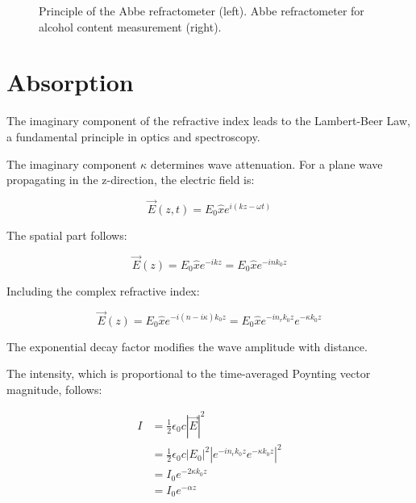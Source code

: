 \documentclass[
  a4paper,
]{book}
\begin{document}
\begin{tcolorbox}
\begin{figure}[H]
\caption{\label{fig-abbe}Principle of the Abbe refractometer (left).
Abbe refractometer for alcohol content measurement (right).}

\end{figure}%

\end{tcolorbox}

\section{Absorption}\label{absorption}

\begin{tcolorbox}[enhanced jigsaw, coltitle=black, title=\textcolor{quarto-callout-important-color}{\faExclamation}\hspace{0.5em}{Important}, colframe=quarto-callout-important-color-frame, toprule=.15mm, opacitybacktitle=0.6, left=2mm, opacityback=0, breakable, toptitle=1mm, bottomtitle=1mm, leftrule=.75mm, arc=.35mm, titlerule=0mm, colbacktitle=quarto-callout-important-color!10!white, rightrule=.15mm, bottomrule=.15mm, colback=white]

The imaginary component of the refractive index leads to the
Lambert-Beer Law, a fundamental principle in optics and spectroscopy.

\end{tcolorbox}

The imaginary component \(\kappa\) determines wave attenuation. For a
plane wave propagating in the z-direction, the electric field is:

\[
\vec{E}(z,t) = E_0\hat{x}e^{i(kz-\omega t)}
\]

The spatial part follows:

\[
\vec{E}(z)=E_0\hat{x}e^{-ik z}=E_0\hat{x}e^{-in k_0 z}
\]

Including the complex refractive index:

\[
\vec{E}(z)=E_0\hat{x}e^{-i(n-i\kappa) k_0 z} =E_0\hat{x} e^{-i n_r k_0 z}e^{-\kappa k_0 z}
\]

The exponential decay factor modifies the wave amplitude with distance.

The intensity, which is proportional to the time-averaged Poynting
vector magnitude, follows:

\begin{align}
I &= \frac{1}{2}\epsilon_0 c|\vec{E}|^2 \\
  &= \frac{1}{2}\epsilon_0 c |E_0|^2 \left | e^{-in_r k_0 z }e^{-\kappa k_0 z} \right |^2\\
  &= I_0 e^{-2\kappa k_0 z} \\
  &= I_0 e^{-\alpha z}
\end{align}
\end{document}
